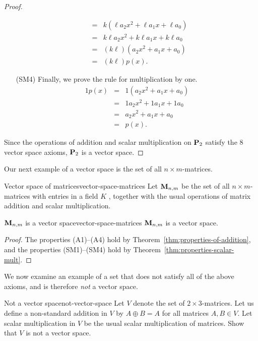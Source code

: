 \begin{proof}
\begin{itemize}
\begin{eqnarray*}
               &=& k(\ell a_2x^2 + \ell a_1x + \ell a_0)\\
               &=&  k\ell a_2x^2 + k\ell a_1x + k\ell a_0 \\
               &=& (k\ell) (a_2x^2 + a_1x + a_0)\\
               &=& (k\ell) p(x).
    \end{eqnarray*}
  \item[(SM4)] Finally, we prove the rule for multiplication by one.
    \begin{eqnarray*}
      1p(x) &=& 1 (a_2x^2 + a_1x + a_0)\\
            &=& 1a_2x^2 + 1a_1x + 1a_0\\
            &=& a_2x^2 + a_1x + a_0\\
            &=& p(x).
    \end{eqnarray*}
  \end{itemize}
  Since the operations of addition and scalar multiplication on
  $\mathbf{P}_2$ satisfy the $8$ vector space axioms, $\mathbf{P}_2$ is a vector
  space.
\end{proof}

Our next example of a vector space is the set of all
$n\times m$-matrices.

\begin{example}{Vector space of matrices}{vector-space-matrices}
  Let $\mathbf{M}_{n,m}$%
   be the set of all $n\times m$-matrices
  with entries in a field $K$%
  , together with the usual operations
  of matrix addition and scalar multiplication.
\end{example}

\begin{proposition}{$\mathbf{M}_{n,m}$ is a vector space}{vector-space-matrices}
  $\mathbf{M}_{n,m}$ is a vector space.
\end{proposition}

\begin{proof}
  The properties (A1)--(A4) hold by
  Theorem~\ref{thm:properties-of-addition}, and the properties
  (SM1)--(SM4) hold by Theorem~\ref{thm:properties-scalar-mult}.
\end{proof}

We now examine an example of a set that does not satisfy all of the
above axioms, and is therefore \textit{not} a vector space.

\begin{example}{Not a vector space}{not-vector-space}
  Let $V$ denote the set of $2 \times 3$-matrices. Let us define a
  non-standard addition in $V$ by $A \oplus B = A$ for all matrices
  $A,B\in V$. Let scalar multiplication in $V$ be the usual scalar
  multiplication of matrices. Show that $V$ is not a vector space.
\end{example}

